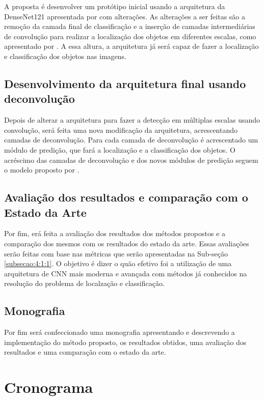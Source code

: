 A proposta é desenvolver um protótipo inicial usando a arquitetura da \ac{DenseNet}121 apresentada por  com alterações. As alterações a ser feitas são a remoção da camada final de classificação e a inserção de camadas intermediárias de convolução para realizar a localização dos objetos em diferentes escalas, como apresentado por . A essa altura, a arquitetura já será capaz de fazer a localização e classificação dos objetos nas imagens.

\subsection{Desenvolvimento da arquitetura final usando deconvolução}
\label{subsecao:4:1:4}

Depois de alterar a arquitetura para fazer a detecção em múltiplas escalas usando convolução, será feita uma nova modificação da arquitetura, acrescentando camadas de deconvolução. Para cada camada de deconvolução é acrescentado um módulo de predição, que fará a localização e a classificação dos objetos. O acréscimo das camadas de deconvolução e dos novos módulos de predição seguem o modelo proposto por .

\subsection{Avaliação dos resultados e comparação com o Estado da Arte}
\label{subsecao:4:1:5}

Por fim, erá feita a avaliação dos resultados dos métodos propostos e a comparação dos mesmos com os resultados do estado da arte. Essas avaliações serão feitas com base nas métricas que serão apresentadas na Sub-seção \ref{subsecao:4:1:1}. O objetivo é dizer o quão efetivo foi a utilização de uma arquitetura de \ac{CNN} mais moderna e avançada com métodos já conhecidos na resolução do problema de localzação e classificação.

\subsection{Monografia}
\label{subsecao:4:1:6}

Por fim será confeccionado uma monografia apresentando e descrevendo a implementação do método proposto, os resultados obtidos, uma avaliação dos resultados e uma comparação com o estado da arte.

\section{Cronograma}
\label{secao:4:2}

